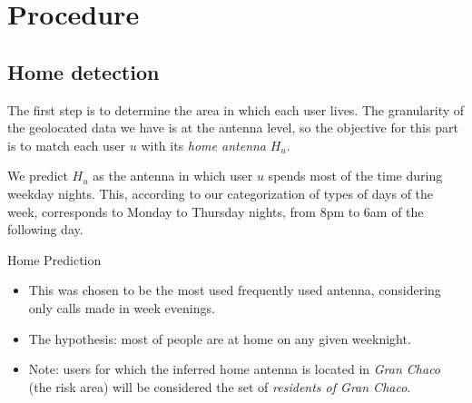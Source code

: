 
\section{Procedure}
\subsection{Home detection}
    The first step is to determine the area in which each user lives. The granularity of the geolocated data we have is at the antenna level, so the objective for this part is to match each user $u$ with its \textit{home antenna} $H_u$.
    
    We predict $H_u$ as the antenna in which user $u$ spends most of the time during weekday nights. This, according to our categorization of types of days of the week, corresponds to Monday to Thursday nights, from 8pm to 6am of the following day.

	\begin{block}{Home Prediction}
		\begin{itemize}
			
			\item This was chosen to be the most used frequently used antenna, considering only calls made in week evenings.
			
			\item The hypothesis: most of people are at home on any given weeknight. 

			\item Note: users for which the inferred home antenna is located in \textit{Gran Chaco} (the risk area) will
			be considered the set of \textit{residents of Gran Chaco}. 
			
		\end{itemize}
	\end{block}

